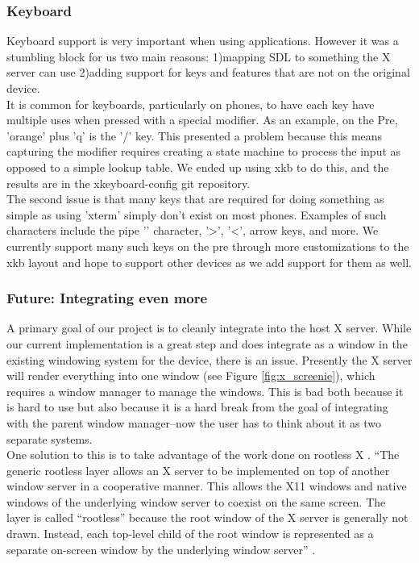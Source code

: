 \subsubsection{Keyboard}
Keyboard support is very important when using applications.  However it was a stumbling block for us two main reasons: 1)mapping SDL to something the X server can use 2)adding support for keys and features that are not on the original device.\\
It is common for keyboards, particularly on phones, to have each key have multiple uses when pressed with a special modifier.  As an example, on the Pre, 'orange' plus 'q' is the '/' key.  This presented a problem because this means capturing the modifier requires creating a state machine to process the input as opposed to a simple lookup table.  We ended up using xkb to do this, and the results are in the xkeyboard-config git repository. \\
The second issue is that many keys that are required for doing something as simple as using 'xterm' simply don't exist on most phones.  Examples of such characters include the pipe '\textbar' character, '\textgreater', '\textless', arrow keys, and more.  We currently support many such keys on the pre through more customizations to the xkb layout and hope to support other devices as we add support for them as well.
\subsubsection{Future: Integrating even more}
A primary goal of our project is to cleanly integrate into the host X server.  While our current implementation is a great step and does integrate as a window in the existing windowing system for the device, there is an issue.  Presently the X server will render everything into one window (see Figure \ref{fig:x_screenie}), which requires a window manager to manage the windows.  This is bad both because it is hard to use but also because it is a hard break from the goal of integrating with the parent window manager--now the user has to think about it as two separate systems.\\

One solution to this is to take advantage of the work done on rootless X \cite{rootless}.  ``The generic rootless layer allows an X server to be implemented on top of another window server in a cooperative manner. This allows the X11 windows and native windows of the underlying window server to coexist on the same screen. The layer is called ``rootless'' because the root window of the X server is generally not drawn. Instead, each top-level child of the root window is represented as a separate on-screen window by the underlying window server'' \cite{rootless}.\\

